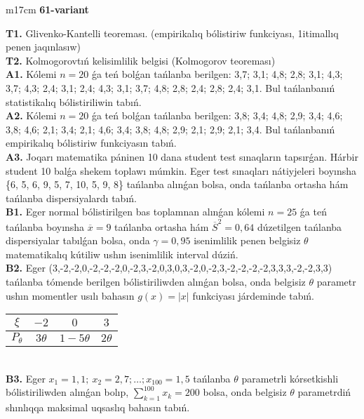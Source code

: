 \documentclass{article}
\begin{document}
\begin{tabular}{m{17cm}}
\textbf{61-variant}
\newline

\textbf{T1.} 
Glivenko-Kantelli teoreması. (empirikalıq bólistiriw funkciyası, 1itimallıq penen jaqınlasıw)
 \\
\textbf{T2.} 
Kolmogorovtıń kelisimlilik belgisi (Kolmogorov teoreması)
 \\
\textbf{A1.} 
Kólemi \(n = 20\) ǵa teń bolǵan tańlanba berilgen: 3,7; 3,1; 4,8; 2,8; 3,1; 4,3; 3,7; 4,3; 2,4; 3,1; 2,4; 4,3; 3,1; 3,7; 4,8; 2,8; 2,4; 2,8; 2,4; 3,1. Bul tańlanbanıń statistikalıq bólistiriliwin tabıń.
 \\
\textbf{A2.} 
Kólemi \(n = 20\) ǵa teń bolǵan tańlanba berilgen: 3,8; 3,4; 4,8; 2,9; 3,4; 4,6; 3,8; 4,6; 2,1; 3,4; 2,1; 4,6; 3,4; 3,8; 4,8; 2,9; 2,1; 2,9; 2,1; 3,4. Bul tańlanbanıń empirikalıq bólistiriw funkciyasın tabıń.
 \\
\textbf{A3.} 
Joqarı matematika páninen 10 dana student test sınaqların tapsırǵan. Hárbir student 10 balǵa shekem toplawı múmkin. Eger test sınaqları nátiyjeleri boyınsha \{6, 5, 6, 9, 5, 7, 10, 5, 9, 8\} tańlanba alınǵan bolsa, onda tańlanba ortasha hám tańlanba dispersiyalardı tabıń.
 \\
\textbf{B1.} 
Eger normal bólistirilgen bas toplamnan alınǵan kólemi \(n = 25\) ǵa teń tańlanba boyınsha \(\overline{x} = 9\) tańlanba ortasha hám \({\overline{S}}^{2} = 0,64\) dúzetilgen tańlanba dispersiyalar tabılǵan bolsa, onda \(\gamma = 0,95\) isenimlilik penen belgisiz \(\theta\) matematikalıq kútiliw ushın isenimlilik interval dúziń.
 \\
\textbf{B2.} 
Eger (3,-2,-2,0,-2,-2,-2,0,-2,3,-2,0,3,0,3,-2,0,-2,3,-2,-2,-2,-2,3,3,3,-2,-2,3,3) tańlanba tómende berilgen bólistiriliwden alınǵan bolsa, onda belgisiz \(\theta\) parametr ushın momentler usılı bahasın \(g(x) = |x|\) funkciyası járdeminde tabıń.
\begin{tabular}{|c|c|c|c|}
  \hline
$\xi$ &
$- 2$ &
$0$ &
$3$ \\
\hline
\(P_{\theta}\) & \(3\theta\) & \(1 - 5\theta\) & \(2\theta\) \\
\hline
\end{tabular}
 \\
\textbf{B3.} 
Eger \(x_{1} = 1,1;\ x_{2} = 2,7;\ldots;x_{100} = 1,5\) tańlanba \(\theta\) parametrli kórsetkishli bólistiriliwden alınǵan bolıp, \(\sum_{k = 1}^{100}x_{k} = 200\) bolsa, onda belgisiz \(\theta\) parametrdiń shınlıqqa maksimal uqsaslıq bahasın tabıń.
 \\

\end{tabular}
\end{document}

